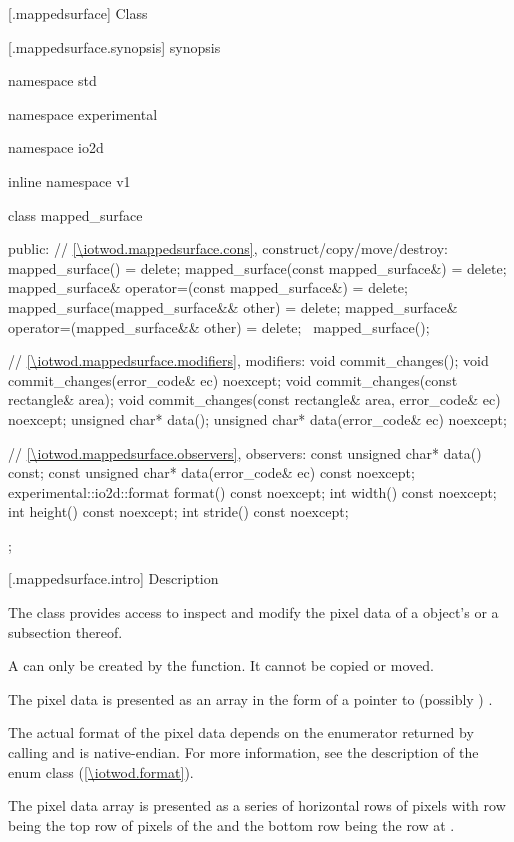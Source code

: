  [\iotwod.mappedsurface] {Class }

 [\iotwod.mappedsurface.synopsis] { synopsis}

\begin{codeblock}
namespace std { namespace experimental { namespace io2d { inline namespace v1 {
  class mapped_surface {
  public:
    // \ref{\iotwod.mappedsurface.cons}, construct/copy/move/destroy:
    mapped_surface() = delete;
    mapped_surface(const mapped_surface&) = delete;
    mapped_surface& operator=(const mapped_surface&) = delete;
    mapped_surface(mapped_surface&& other) = delete;
    mapped_surface& operator=(mapped_surface&& other) = delete;
    ~mapped_surface();
    
    // \ref{\iotwod.mappedsurface.modifiers}, modifiers:
    void commit_changes();
    void commit_changes(error_code& ec) noexcept;
    void commit_changes(const rectangle& area);
    void commit_changes(const rectangle& area, error_code& ec) noexcept;
    unsigned char* data();
    unsigned char* data(error_code& ec) noexcept;
    
    // \ref{\iotwod.mappedsurface.observers}, observers:
    const unsigned char* data() const;
    const unsigned char* data(error_code& ec) const noexcept;
    experimental::io2d::format format() const noexcept;
    int width() const noexcept;
    int height() const noexcept;
    int stride() const noexcept;
  };
} } } }
\end{codeblock}

 [\iotwod.mappedsurface.intro] { Description}

\pnum
{}
The  class provides access to inspect and modify the pixel data of a  object's \underlyingsurface or a subsection thereof.

\pnum
A  can only be created by the  function. It cannot be copied or moved.

\pnum
The pixel data is presented as an array in the form of a pointer to (possibly ) .

\pnum
The actual format of the pixel data depends on the  enumerator returned by calling  and is native-endian. For more information, see the description of the  enum class (\ref{\iotwod.format}).

\pnum
The pixel data array is presented as a series of horizontal rows of pixels with row  being the top row of pixels of the \underlyingsurface and the bottom row being the row at .

